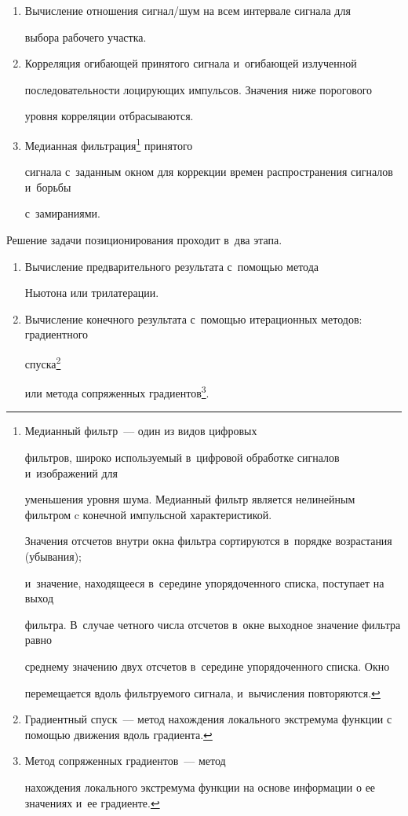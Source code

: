      \begin{enumerate}[1.]

  \item Вычисление отношения сигнал\!/\!шум на всем интервале сигнала для 

выбора рабочего участка.

  \item Корреляция огибающей принятого сигнала и~огибающей излученной 

последовательности лоцирующих импульсов. Значения ниже порогового 

уровня корреляции отбрасываются. 

\item Медианная фильтрация\footnote{Медианный фильтр~--- один из видов цифровых 

фильтров, широко используемый в~цифровой обработке сигналов и~изображений для 

уменьшения уровня шума. Медианный фильтр является нелинейным фильт\-ром c конечной импульсной характеристикой. 

Значения отсчетов внутри окна фильтра сортируются в~порядке возрастания (убывания); 

и~значение, находящееся в~середине упорядоченного списка, поступает на выход 

фильтра. В~случае четного числа отсчетов в~окне выходное значение фильтра равно 

среднему значению двух отсчетов в~середине упорядоченного списка. Окно 

перемещается вдоль фильтруемого сигнала, и~вычисления повторяются.} принятого 

сигнала с~заданным окном для коррекции времен распространения сигналов и~борьбы 

с~замираниями.

     \end{enumerate}

     

     Решение задачи позиционирования проходит в~два этапа.

  \begin{enumerate}[1.]

  \item Вычисление предварительного результата с~помощью метода 

Ньютона или трилатерации.

\item Вычисление конечного результата с~помощью итерационных методов: градиентного 

спуска\footnote{Градиентный спуск~--- метод нахождения локального экстремума функции с помощью движения вдоль градиента.} 

или метода сопряженных градиентов\footnote{Метод сопряженных градиентов~--- метод 

нахождения локального экстремума функции на основе информации о ее значениях и~ее градиенте.}.

     \end{enumerate}


